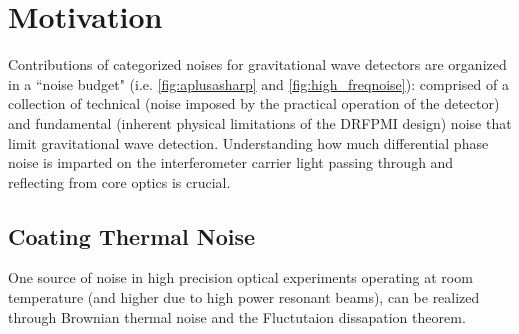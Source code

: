 


\section{Motivation}
Contributions of categorized noises for gravitational wave detectors are organized in a ``noise budget" (i.e. \autoref{fig:aplusasharp} and \autoref{fig:high_freqnoise}): comprised of a collection of technical (noise imposed by the practical operation of the detector) and fundamental (inherent physical limitations of the DRFPMI design) noise that limit gravitational wave detection. Understanding how much differential phase noise is imparted on the interferometer carrier light passing through and reflecting from core optics is crucial.

\subsection{Coating Thermal Noise}
One source of noise in high precision optical experiments operating at room temperature (and higher due to high power resonant beams), can be realized through Brownian thermal noise and the Fluctutaion dissapation theorem. 

